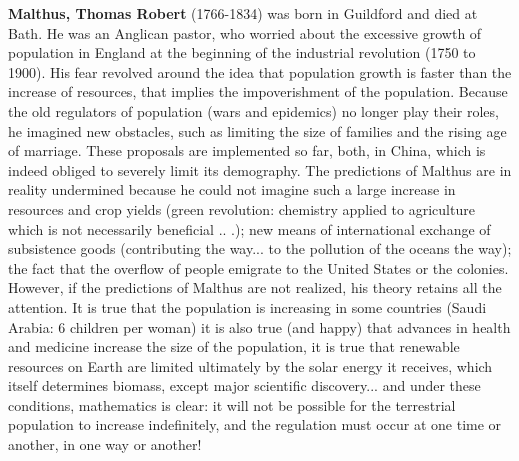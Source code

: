 \textbf{Malthus, Thomas Robert} (1766-1834) was born in Guildford and died at Bath. He was an Anglican pastor, who worried about the excessive growth of population in England at the beginning of the industrial revolution (1750 to 1900). His fear revolved around the idea that population growth is faster than the increase of resources, that implies the impoverishment of the population. Because the old regulators of population (wars and epidemics) no longer play their roles, he imagined new obstacles, such as limiting the size of families and the rising age of marriage. These proposals are implemented so far, both, in China, which is indeed obliged to severely limit its demography. The predictions of Malthus are in reality undermined because he could not imagine such a large increase in resources and crop yields (green revolution: chemistry applied to agriculture which is not necessarily beneficial .. .); new means of international exchange of subsistence goods (contributing the way... to the pollution of the oceans the way); the fact that the overflow of people emigrate to the United States or the colonies. However, if the predictions of Malthus are not realized, his theory retains all the attention. It is true that the population is increasing in some countries (Saudi Arabia: 6 children per woman) it is also true (and happy) that advances in health and medicine increase the size of the population, it is true that renewable resources on Earth are limited ultimately by the solar energy it receives, which itself determines biomass, except major scientific discovery... and under these conditions, mathematics is clear: it will not be possible for the terrestrial population to increase indefinitely, and the regulation must occur at one time or another, in one way or another!

